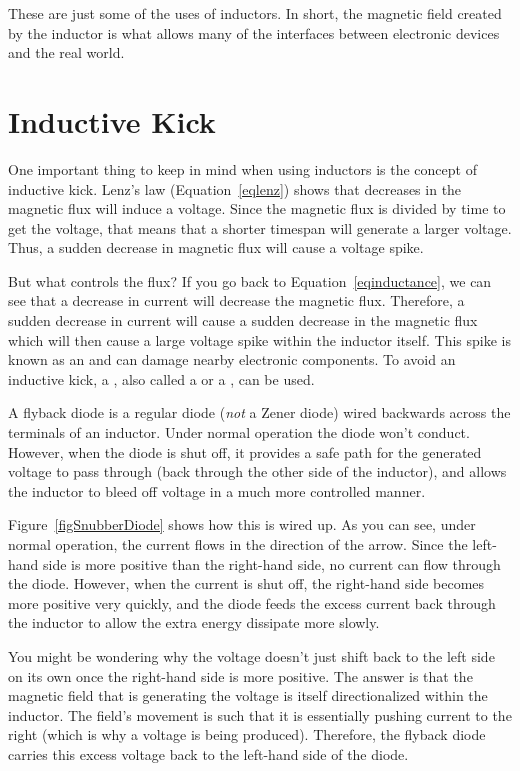 These are just some of the uses of inductors.  
In short, the magnetic field created by the inductor is what allows many of the interfaces between electronic devices and the real world.

\section{Inductive Kick}

One important thing to keep in mind when using inductors is the concept of inductive kick.
Lenz's law (Equation~\ref{eqlenz}) shows that decreases in the magnetic flux will induce a voltage.  
Since the magnetic flux is divided by time to get the voltage, that means that a shorter timespan will generate a larger voltage.
Thus, a sudden decrease in magnetic flux will cause a voltage spike.

But what controls the flux?
If you go back to Equation~\ref{eqinductance}, we can see that a decrease in current will decrease the magnetic flux.
Therefore, a sudden decrease in current will cause a sudden decrease in the magnetic flux which will then cause a large voltage spike within the inductor itself.
This spike is known as an  and can damage nearby electronic components.
To avoid an inductive kick, a , also called a  or a , can be used.

A flyback diode is a regular diode (\emph{not} a Zener diode) wired backwards across the terminals of an inductor.
Under normal operation the diode won't conduct.
However, when the diode is shut off, it provides a safe path for the generated voltage to pass through (back through the other side of the inductor), and allows the inductor to bleed off voltage in a much more controlled manner.


Figure~\ref{figSnubberDiode} shows how this is wired up.  
As you can see, under normal operation, the current flows in the direction of the arrow.
Since the left-hand side is more positive than the right-hand side, no current can flow through the diode.
However, when the current is shut off, the right-hand side becomes more positive very quickly, and the diode feeds the excess current back through the inductor to allow the extra energy dissipate more slowly.

You might be wondering why the voltage doesn't just shift back to the left side on its own once the right-hand side is more positive.
The answer is that the magnetic field that is generating the voltage is itself directionalized within the inductor.  The field's movement is such that it is essentially pushing current to the right (which is why a voltage is being produced).
Therefore, the flyback diode carries this excess voltage back to the left-hand side of the diode.


